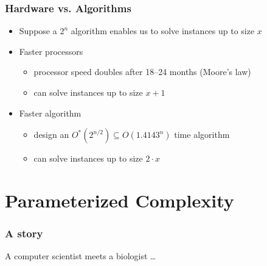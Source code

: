 \begin{frame}
 \frametitle{Hardware vs. Algorithms}

 \begin{itemize}
  \item Suppose a $2^n$ algorithm enables us to solve instances up to size $x$
  \item Faster processors
  \begin{itemize}
   \item processor speed doubles after 18--24 months (Moore's law)
   \item can solve instances up to size $x+1$
  \end{itemize}
  \item Faster algorithm
  \begin{itemize}
   \item design an $O^*(2^{n/2}) \subseteq O(1.4143^{n})$ time algorithm
   \item can solve instances up to size $2 \cdot x$
  \end{itemize}
 \end{itemize}

\end{frame}


\section{Parameterized Complexity}


\begin{frame}
  \frametitle{A story}

 \noindent
  A computer scientist meets a biologist \ldots
  \slides{\vspace{6.5cm}}
  
\end{frame}

